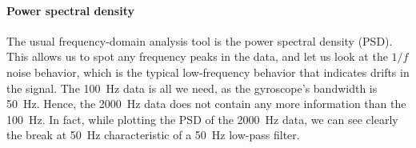 \paragraph{Power spectral density}

The usual frequency-domain analysis tool is the power spectral density (PSD). This allows us to spot any frequency peaks in the data, and let us look at the $1/f$ noise behavior, which is the typical low-frequency behavior that indicates drifts in the signal. The \SI{100}{\hertz} data is all we need, as the gyroscope's bandwidth is \SI{50}{\hertz}. Hence, the \SI{2000}{\hertz} data does not contain any more information than the \SI{100}{\hertz}. In fact, while plotting the PSD of the \SI{2000}{\hertz} data, we can see clearly the break at \SI{50}{\hertz} characteristic of a \SI{50}{\hertz} low-pass filter.


